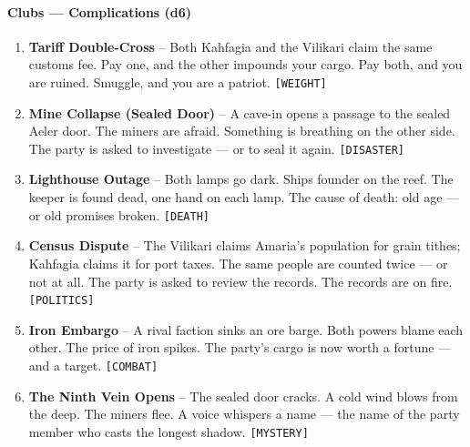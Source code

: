 \paragraph{Clubs --- Complications (d6)}
\begin{enumerate}
\item \textbf{Tariff Double-Cross} -- Both Kahfagia and the Vilikari claim the same customs fee. Pay one, and the other impounds your cargo. Pay both, and you are ruined. Smuggle, and you are a patriot. \texttt{[WEIGHT]}
\item \textbf{Mine Collapse (Sealed Door)} -- A cave-in opens a passage to the sealed Aeler door. The miners are afraid. Something is breathing on the other side. The party is asked to investigate --- or to seal it again. \texttt{[DISASTER]}
\item \textbf{Lighthouse Outage} -- Both lamps go dark. Ships founder on the reef. The keeper is found dead, one hand on each lamp. The cause of death: old age --- or old promises broken. \texttt{[DEATH]}
\item \textbf{Census Dispute} -- The Vilikari claims Amaria's population for grain tithes; Kahfagia claims it for port taxes. The same people are counted twice --- or not at all. The party is asked to review the records. The records are on fire. \texttt{[POLITICS]}
\item \textbf{Iron Embargo} -- A rival faction sinks an ore barge. Both powers blame each other. The price of iron spikes. The party's cargo is now worth a fortune --- and a target. \texttt{[COMBAT]}
\item \textbf{The Ninth Vein Opens} -- The sealed door cracks. A cold wind blows from the deep. The miners flee. A voice whispers a name --- the name of the party member who casts the longest shadow. \texttt{[MYSTERY]}
\end{enumerate}

